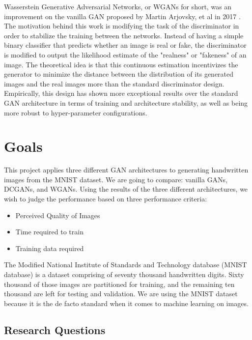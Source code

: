 \documentclass[12pt,
 reprint,
nofootinbib,
 amsmath,amssymb,
 aps,
floatfix,
]{revtex4-2}
\begin{document}
Wasserstein Generative Adversarial Networks, or WGANs for short, was an improvement on the vanilla GAN proposed by Martin Arjovsky, et al in 2017 \cite{arjovsky2017wasserstein}.
The motivation behind this work is modifying the task of the discriminator in order to stabilize the training between the networks. 
Instead of having a simple binary classifier that predicts whether an image is real or fake, the discriminator is modified to output the likelihood estimate of the "realness" or "fakeness" of an image.
The theoretical idea is that this continuous estimation incentivizes the generator to minimize the distance between the distribution of its generated images and the real images more than the standard discriminator design.
Empirically, this design has shown more exceptional results over the standard GAN architecture in terms of training and architecture stability, as well as being more robust to hyper-parameter configurations.


\section{\label{sec:goals}Goals}


This project applies three different GAN architectures to generating handwritten images from the MNIST dataset. 
We are going to compare: vanilla GANs, DCGANs, and WGANs.
Using the results of the three different architectures, we wish to judge the performance based on three performance criteria:

\begin{itemize}
    \item Perceived Quality of Images
    \item Time required to train
    \item Training data required
\end{itemize}{}

The Modified National Institute of Standards and Technology database (MNIST database) is a dataset comprising of seventy thousand handwritten digits.
Sixty thousand of those images are partitioned for training, and the remaining ten thousand are left for testing and validation.
We are using the MNIST dataset because it is the de facto standard when it comes to machine learning on images. 


\subsection{\label{sec:researchQuestions}Research Questions}
\end{document}
